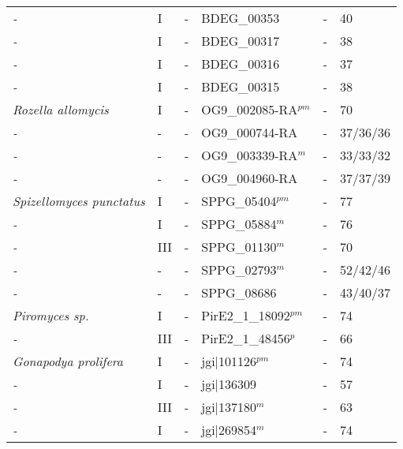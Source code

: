 \begin{table}[tbp]
\begin{tabular}{llllll}
  \emph{-} & I & - & BDEG\_00353 & - & 40 \\ 
  \emph{-} & I & - & BDEG\_00317 & - & 38 \\ 
  \emph{-} & I & - & BDEG\_00316 & - & 37 \\ 
  \emph{-} & I & - & BDEG\_00315 & - & 38 \\ 
  \emph{Rozella allomycis } & I & - & OG9\_002085-RA$^{pm}$ & - & 70 \\ 
  \emph{-} & - & - & OG9\_000744-RA & - & 37/36/36 \\ 
  \emph{-} & - & - & OG9\_003339-RA$^{m}$ & - & 33/33/32 \\ 
  \emph{-} & - & - & OG9\_004960-RA & - & 37/37/39 \\ 
  \emph{Spizellomyces punctatus } & I & - & SPPG\_05404$^{pm}$ & - & 77 \\ 
  \emph{-} & I & - & SPPG\_05884$^{m}$ & - & 76 \\ 
  \emph{-} & III & - & SPPG\_01130$^{m}$ & - & 70 \\ 
  \emph{-} & - & - & SPPG\_02793$^{m}$ & - & 52/42/46 \\ 
  \emph{-} & - & - & SPPG\_08686 & - & 43/40/37 \\ 
  \emph{Piromyces sp. } & I & - & PirE2\_1\_18092$^{pm}$ & - & 74 \\ 
  \emph{-} & III & - & PirE2\_1\_48456$^{p}$ & - & 66 \\ 
  \emph{Gonapodya prolifera } & I & - & jgi|101126$^{pm}$ & - & 74 \\ 
  \emph{-} & I & - & jgi|136309 & - & 57 \\ 
  \emph{-} & III & - & jgi|137180$^{m}$ & - & 63 \\ 
  \emph{-} & I & - & jgi|269854$^{m}$ & - & 74 \\ 
   \hline
\end{tabular}

\end{table}
